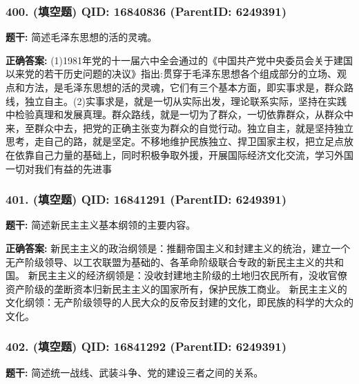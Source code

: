 \documentclass[12pt,UTF8]{ctexart}
\begin{document}
\subsubsection*{400. (填空题) \small QID: 16840836 (ParentID: 6249391)}

\textbf{题干:}
简述毛泽东思想的活的灵魂。



\textbf{正确答案:}
(1)1981年党的十一届六中全会通过的《中国共产党中央委员会关于建国以来党的若干历史问题的决议》指出:贯穿于毛泽东思想各个组成部分的立场、观点和方法，是毛泽东思想的活的灵魂，它们有三个基本方面，即实事求是，群众路线，独立自主。(2)实事求是，就是一切从实际出发，理论联系实际，坚持在实践中检验真理和发展真理。群众路线，就是一切为了群众，一切依靠群众，从群众中来，至群众中去，把党的正确主张变为群众的自觉行动。独立自主，就是坚持独立思考，走自己的路，就是坚定。不移地维护民族独立、捍卫国家主权，把立足点放在依靠自己力量的基础上，同时积极争取外援，开展国际经济文化交流，学习外国一切对我们有益的先进事

\vspace{0.3em}\hrulefill\vspace{0.7em}

\subsubsection*{401. (填空题) \small QID: 16841291 (ParentID: 6249391)}

\textbf{题干:}
简述新民主主义基本纲领的主要内容。



\textbf{正确答案:}
新民主主义的政治纲领是：推翻帝国主义和封建主义的统治，建立一个无产阶级领导、以工农联盟为基础的、各革命阶级联合专政的新民主主义的共和国。
新民主主义的经济纲领是：没收封建地主阶级的土地归农民所有，没收官僚资产阶级的垄断资本归新民主主义的国家所有，保护民族工商业。
新民主主义的文化纲领：无产阶级领导的人民大众的反帝反封建的文化，即民族的科学的大众的文化。

\vspace{0.3em}\hrulefill\vspace{0.7em}

\subsubsection*{402. (填空题) \small QID: 16841292 (ParentID: 6249391)}

\textbf{题干:}
简述统一战线、武装斗争、党的建设三者之间的关系。
\end{document}
